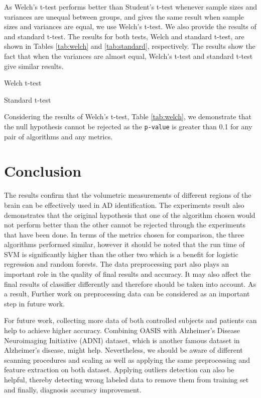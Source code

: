 As Welch's t-test performs better than Student's t-test whenever sample sizes and variances are unequal between groups, and gives the same result when sample sizes and variances are equal, we use Welch's t-test. We also provide the results of and standard t-test. The results for both tests, Welch and standard t-test, are shown in Tables \ref{tab:welch} and \ref{tab:standard}, respectively. The results show the fact that when the variances are almost equal, Welch's t-test and standard t-test give similar results.

\begin{table}
	\centering
	\caption{Welch t-test}
	\label{tab:welch}
\end{table}

\begin{table}
	\centering
	\caption{Standard t-test}
	\label{tab:standard}
\end{table}

Considering the results of Welch's t-test, Table \ref{tab:welch}, we demonstrate that the null hypothesis cannot be rejected as the \texttt{p-value} is greater than 0.1 for any pair of algorithms and any metrics.

\section{Conclusion}
The results confirm that the volumetric measurements of different regions of the brain can be effectively used in AD identification. The experiments result also demonstrates that the original hypothesis that one of the algorithm chosen would not perform better than the other cannot be rejected through the experiments that have been done. In terms of the metrics chosen for comparison, the three algorithms performed similar, however it should be noted that the run time of SVM is significantly higher than the other two which is a benefit for logistic regression and random forests. The data preprocessing part also plays an important role in the quality of final results and accuracy. It may also affect the final results of classifier differently and therefore should be taken into account. As a result, Further work on preprocessing data can be considered as an important step in future work.

For future work, collecting more data of both controlled subjects and patients can help to achieve higher accuracy. Combining OASIS with Alzheimer’s Disease Neuroimaging Initiative (ADNI) dataset, which is another famous dataset in Alzheimer's disease, might help. Nevertheless, we should be aware of different scanning procedures and scaling as well as applying the same preprocessing and feature extraction on both dataset. Applying outliers detection can also be helpful, thereby detecting wrong labeled data to remove them from training set and finally, diagnosis accuracy improvement.



